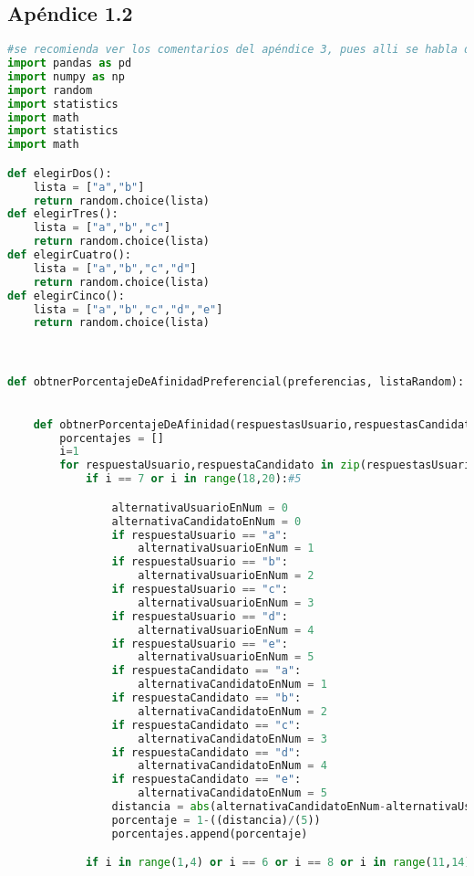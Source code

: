 \documentclass[a4paper]{article}
\begin{document}
\subsection{Apéndice 1.2}
\begin{lstlisting}[language = Python]
#se recomienda ver los comentarios del apéndice 3, pues alli se habla de lo principal
import pandas as pd
import numpy as np
import random
import statistics
import math
import statistics
import math

def elegirDos():
    lista = ["a","b"]
    return random.choice(lista)
def elegirTres():
    lista = ["a","b","c"]
    return random.choice(lista)
def elegirCuatro():
    lista = ["a","b","c","d"]
    return random.choice(lista)
def elegirCinco():
    lista = ["a","b","c","d","e"]
    return random.choice(lista)



def obtnerPorcentajeDeAfinidadPreferencial(preferencias, listaRandom):
    

    def obtnerPorcentajeDeAfinidad(respuestasUsuario,respuestasCandidato, preferencias):
        porcentajes = []
        i=1
        for respuestaUsuario,respuestaCandidato in zip(respuestasUsuario,respuestasCandidato):
            if i == 7 or i in range(18,20):#5

                alternativaUsuarioEnNum = 0
                alternativaCandidatoEnNum = 0
                if respuestaUsuario == "a":
                    alternativaUsuarioEnNum = 1
                if respuestaUsuario == "b":
                    alternativaUsuarioEnNum = 2
                if respuestaUsuario == "c":
                    alternativaUsuarioEnNum = 3
                if respuestaUsuario == "d":
                    alternativaUsuarioEnNum = 4
                if respuestaUsuario == "e":
                    alternativaUsuarioEnNum = 5
                if respuestaCandidato == "a":
                    alternativaCandidatoEnNum = 1
                if respuestaCandidato == "b":
                    alternativaCandidatoEnNum = 2
                if respuestaCandidato == "c":
                    alternativaCandidatoEnNum = 3
                if respuestaCandidato == "d":
                    alternativaCandidatoEnNum = 4
                if respuestaCandidato == "e":
                    alternativaCandidatoEnNum = 5
                distancia = abs(alternativaCandidatoEnNum-alternativaUsuarioEnNum)
                porcentaje = 1-((distancia)/(5))
                porcentajes.append(porcentaje)

            if i in range(1,4) or i == 6 or i == 8 or i in range(11,14) or i in range(16,18) or i == 22: 


\end{lstlisting}
\end{document}
